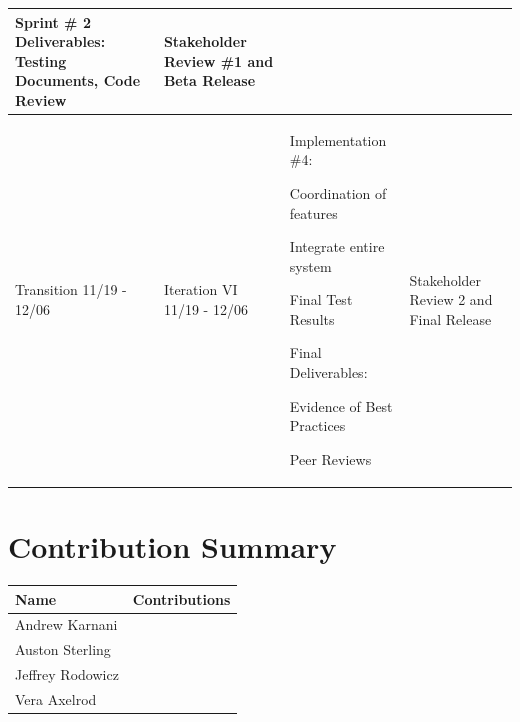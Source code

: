 \documentclass[11pt]{article}
\newenvironment{packed_itemize}{
\begin{itemize}
  \setlength{\itemsep}{1pt}
  \setlength{\parskip}{0pt}
  \setlength{\parsep}{0pt}
}{\end{itemize}}
\begin{document}
\begin{tabular}{|m{0.9in}|m{0.9in}|m{4in}|m{.8in}|}
Sprint \# 2 Deliverables:
 Testing Documents, Code Review &
Stakeholder Review \#1
and
Beta Release \\ \hline
Transition  11/19 - 12/06 &
Iteration VI 11/19 - 12/06 & \vspace{0.1in}
Implementation \#4:
	\begin{packed_itemize}
		\vspace{-0.15in}
		\item Coordination of features
		\item Integrate entire system
	\end{packed_itemize}
Final Test Results

Final Deliverables:
	\begin{packed_itemize}
	\vspace{-0.15in}
		\item Evidence of Best Practices
		\item Peer Reviews
	\vspace{-0.15in}
	\end{packed_itemize}
&
Stakeholder Review 2 and Final Release \\
\hline
\end{tabular}


\section{Contribution Summary} %

\begin{tabular}{|m{1.4in}|m{4in}|}
\hline
\textbf{\large Name}     & \textbf{\large Contributions} \\
\hline\hline
 Andrew Karnani
	&
	 \begin{packed_itemize}
		\item
	\end{packed_itemize}
\\
\hline
 Auston Sterling
	&
	 \begin{packed_itemize}
	        \item
	\end{packed_itemize}
\\
\hline
Jeffrey Rodowicz
	&
	 \begin{packed_itemize}
		\item
	\end{packed_itemize}
\\
\hline
Vera Axelrod
	&
	 \begin{packed_itemize}
		\item
	\end{packed_itemize}
\\
\hline
\end{tabular}
\end{document}
